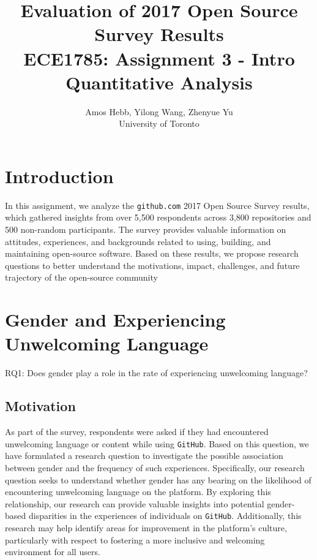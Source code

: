 \documentclass[journal,12pt,onecolumn,]{IEEEtran}
\begin{document}
\title{Evaluation of 2017 Open Source Survey Results \\
{\normalsize ECE1785: Assignment 3 - Intro Quantitative Analysis}}

\author{Amos Hebb, Yilong Wang, Zhenyue Yu\\ \small University of Toronto}

\maketitle

\section{Introduction}

In this assignment, we analyze the \texttt{github.com} 2017 Open Source Survey results,
which gathered insights from over 5,500 respondents across 3,800 repositories and 500 non-random participants.
The survey provides valuable information on attitudes, experiences, and backgrounds related to using, building,
and maintaining open-source software. Based on these results,
we propose research questions to better understand the motivations, impact, challenges, and future trajectory of the open-source community

\section{Gender and Experiencing Unwelcoming Language}

RQ1: Does gender play a role in the rate of experiencing unwelcoming language?

\subsection{Motivation}

As part of the survey, respondents were asked if they had encountered unwelcoming language or content while using \texttt{GitHub}.
Based on this question, we have formulated a research question to investigate the possible association between gender and the frequency of such experiences.
Specifically, our research question seeks to understand whether gender has any bearing on the likelihood of encountering unwelcoming language on the platform.
By exploring this relationship, our research can provide valuable insights into potential gender-based disparities in the experiences of individuals on \texttt{GitHub}.
Additionally, this research may help identify areas for improvement in the platform's culture, particularly with respect to fostering a more inclusive and welcoming environment for all users.
\end{document}
